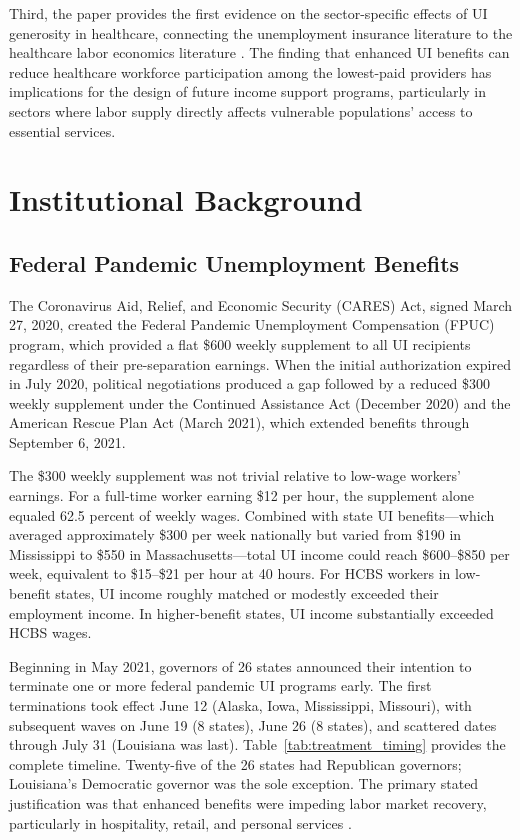 \documentclass[12pt]{article}
\begin{document}
Third, the paper provides the first evidence on the sector-specific effects of UI generosity in healthcare, connecting the unemployment insurance literature to the healthcare labor economics literature \citep{staiger2010, autor2020}. The finding that enhanced UI benefits can reduce healthcare workforce participation among the lowest-paid providers has implications for the design of future income support programs, particularly in sectors where labor supply directly affects vulnerable populations' access to essential services.


\section{Institutional Background}

\subsection{Federal Pandemic Unemployment Benefits}

The Coronavirus Aid, Relief, and Economic Security (CARES) Act, signed March 27, 2020, created the Federal Pandemic Unemployment Compensation (FPUC) program, which provided a flat \$600 weekly supplement to all UI recipients regardless of their pre-separation earnings. When the initial authorization expired in July 2020, political negotiations produced a gap followed by a reduced \$300 weekly supplement under the Continued Assistance Act (December 2020) and the American Rescue Plan Act (March 2021), which extended benefits through September 6, 2021.

The \$300 weekly supplement was not trivial relative to low-wage workers' earnings. For a full-time worker earning \$12 per hour, the supplement alone equaled 62.5 percent of weekly wages. Combined with state UI benefits---which averaged approximately \$300 per week nationally but varied from \$190 in Mississippi to \$550 in Massachusetts---total UI income could reach \$600--\$850 per week, equivalent to \$15--\$21 per hour at 40 hours. For HCBS workers in low-benefit states, UI income roughly matched or modestly exceeded their employment income. In higher-benefit states, UI income substantially exceeded HCBS wages.

Beginning in May 2021, governors of 26 states announced their intention to terminate one or more federal pandemic UI programs early. The first terminations took effect June 12 (Alaska, Iowa, Mississippi, Missouri), with subsequent waves on June 19 (8 states), June 26 (8 states), and scattered dates through July 31 (Louisiana was last). Table~\ref{tab:treatment_timing} provides the complete timeline. Twenty-five of the 26 states had Republican governors; Louisiana's Democratic governor was the sole exception. The primary stated justification was that enhanced benefits were impeding labor market recovery, particularly in hospitality, retail, and personal services \citep{holzer2021}.
\end{document}
